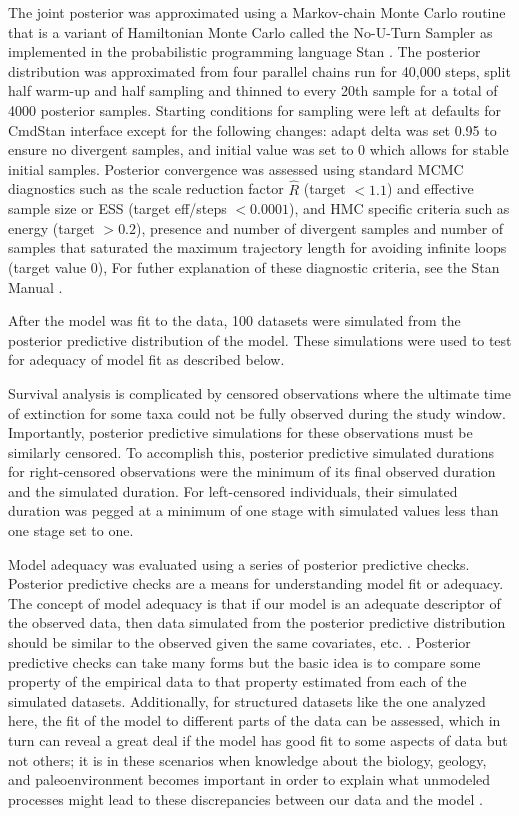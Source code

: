 \documentclass[11pt]{article}
\begin{document}
The joint posterior was approximated using a Markov-chain Monte Carlo routine that is a variant of Hamiltonian Monte Carlo called the No-U-Turn Sampler \citep{Hoffman2014} as implemented in the probabilistic programming language Stan \citep{2014stan}. The posterior distribution was approximated from four parallel chains run for 40,000 steps, split half warm-up and half sampling and thinned to every 20th sample for a total of 4000 posterior samples. Starting conditions for sampling were left at defaults for CmdStan interface except for the following changes: adapt delta was set 0.95 to ensure no divergent samples, and initial value was set to 0 which allows for stable initial samples. Posterior convergence was assessed using standard MCMC diagnostics such as the scale reduction factor \(\hat{R}\) (target \(<1.1\)) and effective sample size or ESS (target eff/steps \(<0.0001\)), and HMC specific criteria such as energy (target \(>0.2\)), presence and number of divergent samples and number of samples that saturated the maximum trajectory length for avoiding infinite loops (target value 0), For futher explanation of these diagnostic criteria, see the Stan Manual \citep{StanManual}.

After the model was fit to the data, 100 datasets were simulated from the posterior predictive distribution of the model. These simulations were used to test for adequacy of model fit as described below.

Survival analysis is complicated by censored observations where the ultimate time of extinction for some taxa could not be fully observed during the study window. Importantly, posterior predictive simulations for these observations must be similarly censored. To accomplish this, posterior predictive simulated durations for right-censored observations were the minimum of its final observed duration and the simulated duration. For left-censored individuals, their simulated duration was pegged at a minimum of one stage with simulated values less than one stage set to one.

Model adequacy was evaluated using a series of posterior predictive checks. Posterior predictive checks are a means for understanding model fit or adequacy. The concept of model adequacy is that if our model is an adequate descriptor of the observed data, then data simulated from the posterior predictive distribution should be similar to the observed given the same covariates, etc. \citep{Gelman2013d}. Posterior predictive checks can take many forms but the basic idea is to compare some property of the empirical data to that property estimated from each of the simulated datasets. Additionally, for structured datasets like the one analyzed here, the fit of the model to different parts of the data can be assessed, which in turn can reveal a great deal if the model has good fit to some aspects of data but not others; it is in these scenarios when knowledge about the biology, geology, and paleoenvironment becomes important in order to explain what unmodeled processes might lead to these discrepancies between our data and the model \citep{Gelman2013d}.
\end{document}
